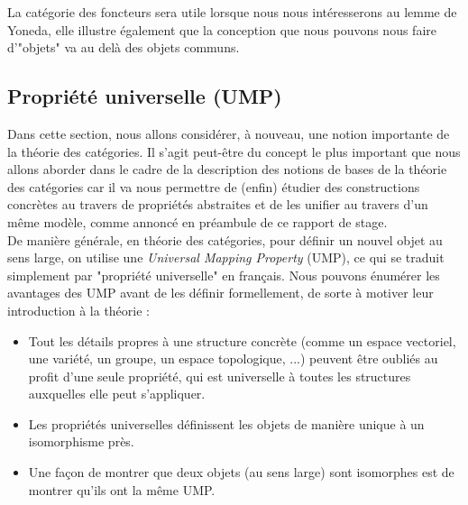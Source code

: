 \documentclass{article}
\begin{document}
La catégorie des foncteurs sera utile lorsque nous nous intéresserons au lemme de Yoneda, elle illustre également que la conception que nous pouvons nous faire d'"objets" va au delà des objets communs.

\subsection{Propriété universelle (UMP)}
Dans cette section, nous allons considérer, à nouveau, une notion importante de la théorie des catégories. Il s'agit peut-être du concept le plus important que nous allons aborder dans le cadre de la description des notions de bases de la théorie des catégories car il va nous permettre de (enfin) étudier des constructions concrètes au travers de propriétés abstraites et de les unifier au travers d'un même modèle, comme annoncé en préambule de ce rapport de stage.\\

De manière générale, en théorie des catégories, pour définir un nouvel objet au sens large, on utilise une \textit{Universal Mapping Property} (UMP), ce qui se traduit simplement par "propriété universelle" en français. Nous pouvons énumérer les avantages des UMP avant de les définir formellement, de sorte à motiver leur introduction à la théorie :

\begin{itemize}[label=\textbullet]
    \item Tout les détails propres à une structure concrète (comme un espace vectoriel, une variété, un groupe, un espace topologique, ...) peuvent être oubliés au profit d'une seule propriété, qui est universelle à toutes les structures auxquelles elle peut s'appliquer.
    \item Les propriétés universelles définissent les objets de manière unique à un isomorphisme près.
    \item Une façon de montrer que deux objets (au sens large) sont isomorphes est de montrer qu'ils ont la même UMP.
\end{itemize}
\end{document}
